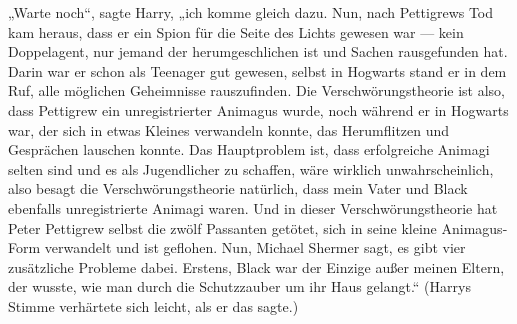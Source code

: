 „Warte noch“, sagte Harry, „ich komme gleich dazu. Nun, nach Pettigrews Tod kam heraus, dass er ein Spion für die Seite des Lichts gewesen war — kein Doppelagent, nur jemand der herumgeschlichen ist und Sachen rausgefunden hat. Darin war er schon als Teenager gut gewesen, selbst in Hogwarts stand er in dem Ruf, alle möglichen Geheimnisse rauszufinden. Die Verschwörungstheorie ist also, dass Pettigrew ein unregistrierter Animagus wurde, noch während er in Hogwarts war, der sich in etwas Kleines verwandeln konnte, das Herumflitzen und Gesprächen lauschen konnte. Das Hauptproblem ist, dass erfolgreiche Animagi selten sind und es als Jugendlicher zu schaffen, wäre wirklich unwahrscheinlich, also besagt die Verschwörungstheorie natürlich, dass mein Vater und Black ebenfalls unregistrierte Animagi waren. Und in dieser Verschwörungstheorie hat Peter Pettigrew selbst die zwölf Passanten getötet, sich in seine kleine Animagus-Form verwandelt und ist geflohen. Nun, Michael Shermer sagt, es gibt vier zusätzliche Probleme dabei. Erstens, Black war der Einzige außer meinen Eltern, der wusste, wie man durch die Schutzzauber um ihr Haus gelangt.“ (Harrys Stimme verhärtete sich leicht, als er das sagte.)
